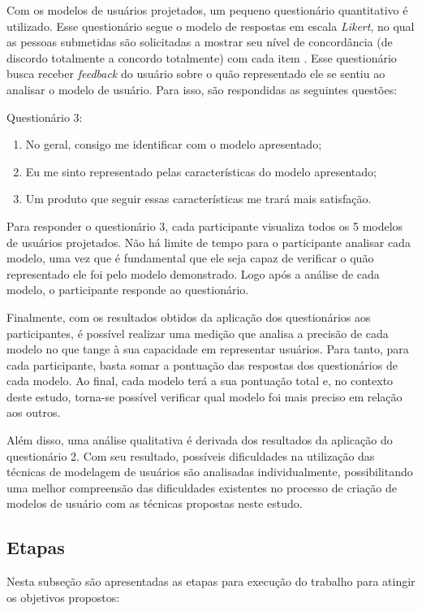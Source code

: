 \documentclass[12pt]{article}
\begin{document}
Com os modelos de usuários projetados, um pequeno questionário quantitativo é utilizado. Esse questionário segue o modelo de respostas em escala \emph{Likert}, no qual as pessoas submetidas são solicitadas a mostrar seu nível de concordância (de discordo totalmente a concordo totalmente) com cada item \cite{likert_scale}. Esse questionário busca receber \emph{feedback} do usuário sobre o quão representado ele se sentiu ao analisar o modelo de usuário. Para isso, são respondidas as seguintes questões: 
\par Questionário 3:
\begin{enumerate}\setlength\itemsep{0.5em}
        \item No geral, consigo me identificar com o modelo apresentado;
        \item Eu me sinto representado pelas características do modelo apresentado;
        \item Um produto que seguir essas características me trará mais satisfação.
\end{enumerate}
Para responder o questionário 3, cada participante visualiza todos os 5 modelos de usuários projetados. Não há limite de tempo para o participante analisar cada modelo, uma vez que é fundamental que ele seja capaz de verificar o quão representado ele foi pelo modelo demonstrado. Logo após a análise de cada modelo, o participante responde ao questionário.

Finalmente, com os resultados obtidos da aplicação dos questionários aos participantes, é possível realizar uma medição que analisa a precisão de cada modelo no que tange à sua capacidade em representar usuários. Para tanto, para cada participante, basta somar a pontuação das respostas dos questionários de cada modelo. Ao final, cada modelo terá a sua pontuação total e, no contexto deste estudo, torna-se possível verificar qual modelo foi mais preciso em relação aos outros.
        
Além disso, uma análise qualitativa é derivada dos resultados da aplicação do questionário 2. Com seu resultado, possíveis dificuldades na utilização das técnicas de modelagem de usuários são analisadas individualmente, possibilitando uma melhor compreensão das dificuldades existentes no processo de criação de modelos de usuário com as técnicas propostas neste estudo.
        
\subsection{Etapas}
Nesta subseção são apresentadas as etapas para execução do trabalho para atingir os objetivos propostos:
\end{document}
